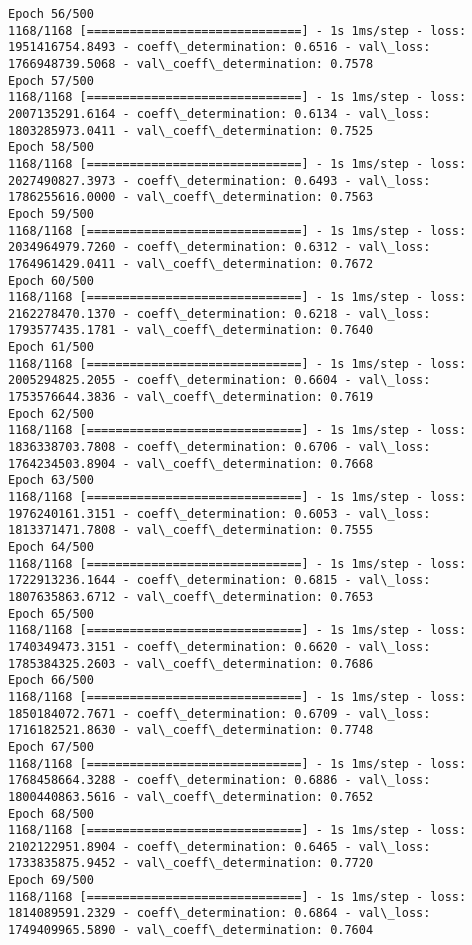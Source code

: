 \documentclass[11pt]{article}
\begin{document}
\begin{Verbatim}[commandchars=\\\{\}]
Epoch 56/500
1168/1168 [==============================] - 1s 1ms/step - loss: 1951416754.8493 - coeff\_determination: 0.6516 - val\_loss: 1766948739.5068 - val\_coeff\_determination: 0.7578
Epoch 57/500
1168/1168 [==============================] - 1s 1ms/step - loss: 2007135291.6164 - coeff\_determination: 0.6134 - val\_loss: 1803285973.0411 - val\_coeff\_determination: 0.7525
Epoch 58/500
1168/1168 [==============================] - 1s 1ms/step - loss: 2027490827.3973 - coeff\_determination: 0.6493 - val\_loss: 1786255616.0000 - val\_coeff\_determination: 0.7563
Epoch 59/500
1168/1168 [==============================] - 1s 1ms/step - loss: 2034964979.7260 - coeff\_determination: 0.6312 - val\_loss: 1764961429.0411 - val\_coeff\_determination: 0.7672
Epoch 60/500
1168/1168 [==============================] - 1s 1ms/step - loss: 2162278470.1370 - coeff\_determination: 0.6218 - val\_loss: 1793577435.1781 - val\_coeff\_determination: 0.7640
Epoch 61/500
1168/1168 [==============================] - 1s 1ms/step - loss: 2005294825.2055 - coeff\_determination: 0.6604 - val\_loss: 1753576644.3836 - val\_coeff\_determination: 0.7619
Epoch 62/500
1168/1168 [==============================] - 1s 1ms/step - loss: 1836338703.7808 - coeff\_determination: 0.6706 - val\_loss: 1764234503.8904 - val\_coeff\_determination: 0.7668
Epoch 63/500
1168/1168 [==============================] - 1s 1ms/step - loss: 1976240161.3151 - coeff\_determination: 0.6053 - val\_loss: 1813371471.7808 - val\_coeff\_determination: 0.7555
Epoch 64/500
1168/1168 [==============================] - 1s 1ms/step - loss: 1722913236.1644 - coeff\_determination: 0.6815 - val\_loss: 1807635863.6712 - val\_coeff\_determination: 0.7653
Epoch 65/500
1168/1168 [==============================] - 1s 1ms/step - loss: 1740349473.3151 - coeff\_determination: 0.6620 - val\_loss: 1785384325.2603 - val\_coeff\_determination: 0.7686
Epoch 66/500
1168/1168 [==============================] - 1s 1ms/step - loss: 1850184072.7671 - coeff\_determination: 0.6709 - val\_loss: 1716182521.8630 - val\_coeff\_determination: 0.7748
Epoch 67/500
1168/1168 [==============================] - 1s 1ms/step - loss: 1768458664.3288 - coeff\_determination: 0.6886 - val\_loss: 1800440863.5616 - val\_coeff\_determination: 0.7652
Epoch 68/500
1168/1168 [==============================] - 1s 1ms/step - loss: 2102122951.8904 - coeff\_determination: 0.6465 - val\_loss: 1733835875.9452 - val\_coeff\_determination: 0.7720
Epoch 69/500
1168/1168 [==============================] - 1s 1ms/step - loss: 1814089591.2329 - coeff\_determination: 0.6864 - val\_loss: 1749409965.5890 - val\_coeff\_determination: 0.7604

\end{Verbatim}
\end{document}
